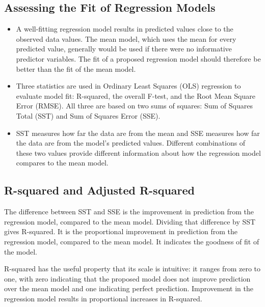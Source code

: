 \documentclass[]{report}
\begin{document}
\subsection*{Assessing the Fit of Regression Models}
\begin{itemize}
\item 
A well-fitting regression model results in predicted values close to the observed data values. The mean model, which uses the mean for every predicted value, generally would be used if there were no informative predictor variables. The fit of a proposed regression model should therefore be better than the fit of the mean model.
\item 
Three statistics are used in Ordinary Least Squares (OLS) regression to evaluate model fit: R-squared, the overall F-test, and the Root Mean Square Error (RMSE). All three are based on two sums of squares: Sum of Squares Total (SST) and Sum of Squares Error (SSE).
\item SST measures how far the data are from the mean and SSE measures how far the data are from the model’s predicted values. Different combinations of these two values provide different information about how the regression model compares to the mean model.
\end{itemize}
\subsection*{R-squared and Adjusted R-squared}

The difference between SST and SSE is the improvement in prediction from the regression model, compared to the mean model. Dividing that difference by SST gives R-squared. It is the proportional improvement in prediction from the regression model, compared to the mean model. It indicates the goodness of fit of the model.

R-squared has the useful property that its scale is intuitive: it ranges from zero to one, with zero indicating that the proposed model does not improve prediction over the mean model and one indicating perfect prediction. Improvement in the regression model results in proportional increases in R-squared.

\newpage
\end{document}
